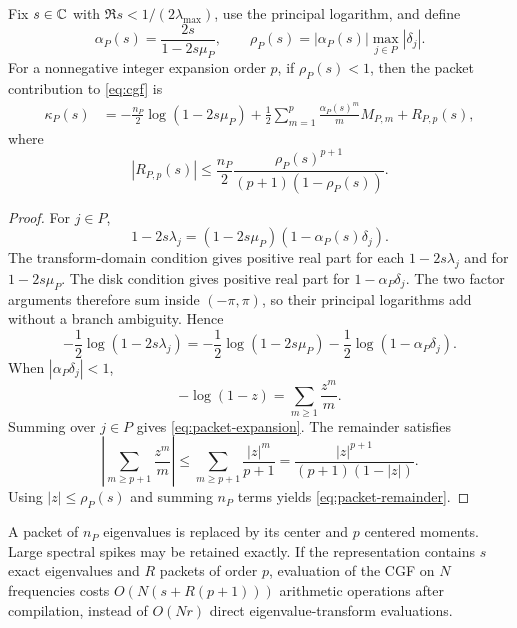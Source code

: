 \begin{theorem}
\label{thm:packet}
Fix $s\in\mathbb C$ with $\Re s<1/(2\lambda_{\max})$, use the principal logarithm, and define
\begin{equation}
\alpha_P(s)=\frac{2s}{1-2s\mu_P},
\qquad
\rho_P(s)=|\alpha_P(s)|\max_{j\in P}|\delta_j|.
\label{eq:alpha-rho}
\end{equation}
For a nonnegative integer expansion order $p$, if $\rho_P(s)<1$, then the packet contribution to \eqref{eq:cgf} is
\begin{align}
\kappa_P(s)
&=-\frac{n_P}{2}\log(1-2s\mu_P)
+\frac12\sum_{m=1}^{p}
\frac{\alpha_P(s)^m}{m}M_{P,m}
+R_{P,p}(s),
\label{eq:packet-expansion}
\end{align}
where
\begin{equation}
|R_{P,p}(s)|
\le
\frac{n_P}{2}
\frac{\rho_P(s)^{p+1}}{(p+1)(1-\rho_P(s))}.
\label{eq:packet-remainder}
\end{equation}
\end{theorem}

\begin{proof}
For $j\in P$,
\[
1-2s\lambda_j
=(1-2s\mu_P)(1-\alpha_P(s)\delta_j).
\]
The transform-domain condition gives positive real part for each
\(1-2s\lambda_j\) and for \(1-2s\mu_P\).  The disk condition gives
positive real part for \(1-\alpha_P\delta_j\).  The two factor arguments
therefore sum inside \((-\pi,\pi)\), so their principal logarithms add
without a branch ambiguity.  Hence
\[
-\frac12\log(1-2s\lambda_j)
=-\frac12\log(1-2s\mu_P)
-\frac12\log(1-\alpha_P\delta_j).
\]
When $|\alpha_P\delta_j|<1$,
\[
-\log(1-z)=\sum_{m\ge1}\frac{z^m}{m}.
\]
Summing over $j\in P$ gives \eqref{eq:packet-expansion}. The remainder satisfies
\[
\left|\sum_{m\ge p+1}\frac{z^m}{m}\right|
\le
\sum_{m\ge p+1}\frac{|z|^m}{p+1}
=\frac{|z|^{p+1}}{(p+1)(1-|z|)}.
\]
Using $|z|\le\rho_P(s)$ and summing $n_P$ terms yields \eqref{eq:packet-remainder}.
\end{proof}

\begin{remark}\label{claim:final-26-3}
A packet of $n_P$ eigenvalues is replaced by its center and $p$ centered moments. Large spectral spikes may be retained exactly. If the representation contains $s$ exact eigenvalues and $R$ packets of order $p$, evaluation of the CGF on $N$ frequencies costs $O(N(s+R(p+1)))$ arithmetic operations after compilation, instead of $O(Nr)$ direct eigenvalue-transform evaluations.
\end{remark}

